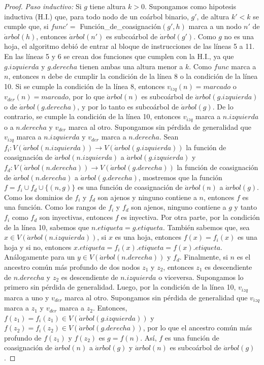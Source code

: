 \begin{proof}
    \emph{Paso inductivo:} Si $g$ tiene altura $k > 0$. Supongamos como
    hipotesis inductiva (H.I.) que, para todo nodo de un coárbol binario, $g'$,
    de altura $k' < k$ se cumple que, si $func' = $
    Función\_de\_coasignación$(g',h)$ marca a un nodo $n'$ de
    $\acute{a}rbol(h)$, entonces $\acute{a}rbol(n')$ es subcoárbol de
    $\acute{a}rbol(g')$. Como $g$ no es una hoja, el algoritmo debió de entrar
    al bloque de instrucciones de las líneas 5 a 11. En las líneas 5 y 6 se
    crean dos funciones que cumplen con la H.I., ya que $g.izquierda$ y
    $g.derecha$ tienen ambas una altura menor a $k$. Como $func$ marca a $n$,
    entonces $n$ debe de cumplir la condición de la línea 8 o la condición de la
    línea 10. Si se cumple la condición de la línea 8, entonces $v_{izq}(n) =
    marcado$ o $v_{der}(n) = marcado$, por lo que $\acute{a}rbol(n)$ es
    subcoárbol de $\acute{a}rbol(g.izquierda)$ o de $\acute{a}rbol(g.derecha)$,
    y por lo tanto es subcoárbol de $\acute{a}rbol(g)$. De lo contrario, se
    cumple la condición de la línea 10, entonces $v_{izq}$ marca a $n.izquierda$
    o a $n.derecha$ y $v_{der}$ marca al otro. Supongamos sin pérdida de
    generalidad que $v_{izq}$ marca a $n.izquierda$ y $v_{der}$ marca a
    $n.derecha$. Sean $f_i:V(\acute{a}rbol(n.izquierda))\rightarrow
    V(\acute{a}rbol(g.izquierda))$ la función de coasignación de
    $\acute{a}rbol(n.izquierda)$ a $\acute{a}rbol(g.izquierda)$ y
    $f_d:V(\acute{a}rbol(n.derecha))\rightarrow V(\acute{a}rbol(g.derecha))$ la
    función de coasignación de $\acute{a}rbol(n.derecha)$ a
    $\acute{a}rbol(g.derecha)$, mostremos que la función $f = f_i \cup f_d \cup
    \{(n,g)\}$ es una función de coasignación de $\acute{a}rbol(n)$ a
    $\acute{a}rbol(g)$. Como los dominios de $f_i$ y $f_d$ son ajenos y ninguno
    contiene a $n$, entonces $f$ es una función. Como los rangos de $f_i$ y
    $f_d$ son ajenos, ninguno contiene a $g$ y tanto $f_i$ como $f_d$ son
    inyectivas, entonces $f$ es inyectiva. Por otra parte, por la condición de
    la línea 10, sabemos que $n.etiqueta = g.etiqueta$. También sabemos que, sea
    $x \in V(\acute{a}rbol(n.izquierda))$, si $x$ es una hoja, entonces $f(x) =
    f_i(x)$ es una hoja y si no, entonces $x.etiqueta = f_i(x).etiqueta =
    f(x).etiqueta$. Análogamente para un $y \in V(\acute{a}rbol(n.derecha))$ y
    $f_d$. Finalmente, si $n$ es el ancestro común más profundo de dos nodos
    $z_1$ y $z_2$, entonces $z_1$ es descendiente de $n.derecha$ y $z_2$ es
    descendiente de $n.izquierda$ o viceversa. Supongamos lo primero sin pérdida
    de generalidad. Luego, por la condición de la línea 10, $v_{izq}$ marca a
    uno y $v_{der}$ marca al otro. Supongamos sin pérdida de generalidad que
    $v_{izq}$ marca a $z_1$ y $v_{der}$ marca a $z_2$. Entonces, $f(z_1) =
    f_i(z_1) \in V(\acute{a}rbol(g.izquierda))$ y $f(z_2) = f_i(z_2) \in
    V(\acute{a}rbol(g.derecha))$, por lo que el ancestro común más profundo de
    $f(z_1)$ y $f(z_2)$ es $g = f(n)$. Así, $f$ es una función de coasignación
    de $\acute{a}rbol(n)$ a $\acute{a}rbol(g)$ y $\acute{a}rbol(n)$ es
    subcoárbol de $\acute{a}rbol(g)$.


\end{proof}
